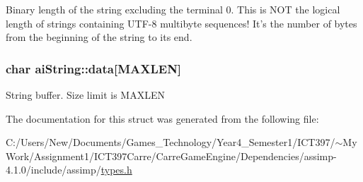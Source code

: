 Binary length of the string excluding the terminal 0. This is NOT the logical length of strings containing UTF-8 multibyte sequences! It's the number of bytes from the beginning of the string to its end. \hypertarget{structai_string_a90b1da7d347a3dcca0a95061e6ea41d}{
\subsubsection[data]{\setlength{\rightskip}{0pt plus 5cm}char {\bf aiString::data}\mbox{[}MAXLEN\mbox{]}}}
\label{structai_string_a90b1da7d347a3dcca0a95061e6ea41d}


String buffer. Size limit is MAXLEN 

The documentation for this struct was generated from the following file:\begin{CompactItemize}
\item 
C:/Users/New/Documents/Games\_\-Technology/Year4\_\-Semester1/ICT397/$\sim$My Work/Assignment1/ICT397Carre/CarreGameEngine/Dependencies/assimp-4.1.0/include/assimp/\hyperlink{types_8h}{types.h}\end{CompactItemize}
